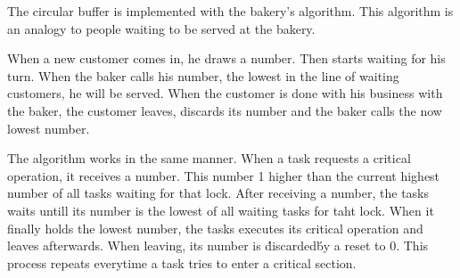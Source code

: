 \begin{homeworkProblem}
\label{sec:circ_buf}
The circular buffer is implemented with the bakery's algorithm. This algorithm is an analogy to people waiting to be served at the bakery. 

When a new customer comes in, he draws a number.
Then starts waiting for his turn. When the baker calls his number, the lowest in the line of waiting customers, he will be served. 
When the customer is done with his business with the baker, the customer leaves, discards its number and the baker calls the now lowest number. 

The algorithm works in the same manner. When a task requests a critical operation, it receives a number. This number 1 higher than the current highest number of all tasks waiting for that lock. 
After receiving a number, the tasks waits untill its number is the lowest of all waiting tasks for taht lock. 
When it finally holds the lowest number, the tasks executes its critical operation and leaves afterwards. When leaving, its number is \'discarded\' by a reset to 0. 
This process repeats everytime a task tries to enter a critical section.


\end{homeworkProblem}